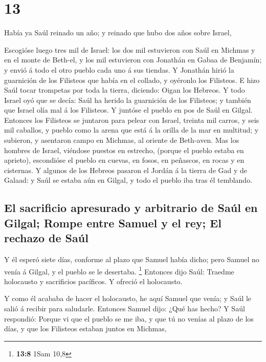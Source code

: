 \hypertarget{section-12}{%
\section{13}\label{section-12}}

 Había ya Saúl reinado un año; y reinado que hubo dos años
sobre Israel,

 Escogióse luego tres mil de Israel: los dos mil estuvieron
con Saúl en Michmas y en el monte de Beth-el, y los mil estuvieron con
Jonathán en Gabaa de Benjamín; y envió á todo el otro pueblo cada uno á
sus tiendas.  Y Jonathán hirió la guarnición de los
Filisteos que había en el collado, y oyéronlo los Filisteos. E hizo Saúl
tocar trompetas por toda la tierra, diciendo: Oigan los Hebreos.
 Y todo Israel oyó que se decía: Saúl ha herido la
guarnición de los Filisteos; y también que Israel olía mal á los
Filisteos. Y juntóse el pueblo en pos de Saúl en Gilgal. 
Entonces los Filisteos se juntaron para pelear con Israel, treinta mil
carros, y seis mil caballos, y pueblo como la arena que está á la orilla
de la mar en multitud; y subieron, y asentaron campo en Michmas, al
oriente de Beth-aven.  Mas los hombres de Israel, viéndose
puestos en estrecho, (porque el pueblo estaba en aprieto), escondióse el
pueblo en cuevas, en fosos, en peñascos, en rocas y en cisternas.
 Y algunos de los Hebreos pasaron el Jordán á la tierra de
Gad y de Galaad: y Saúl se estaba aún en Gilgal, y todo el pueblo iba
tras él temblando.

\hypertarget{el-sacrificio-apresurado-y-arbitrario-de-sauxfal-en-gilgal-rompe-entre-samuel-y-el-rey-el-rechazo-de-sauxfal}{%
\subsection{El sacrificio apresurado y arbitrario de Saúl en Gilgal;
Rompe entre Samuel y el rey; El rechazo de
Saúl}\label{el-sacrificio-apresurado-y-arbitrario-de-sauxfal-en-gilgal-rompe-entre-samuel-y-el-rey-el-rechazo-de-sauxfal}}

 Y él esperó siete días, conforme al plazo que Samuel había
dicho; pero Samuel no venía á Gilgal, y el pueblo se le desertaba.
\footnote{\textbf{13:8} 1Sam 10,8}  Entonces dijo Saúl:
Traedme holocausto y sacrificios pacíficos. Y ofreció el holocausto.

 Y como él acababa de hacer el holocausto, he aquí Samuel
que venía; y Saúl le salió á recibir para saludarle. 
Entonces Samuel dijo: ¿Qué has hecho? Y Saúl respondió: Porque vi que el
pueblo se me iba, y que tú no venías al plazo de los días, y que los
Filisteos estaban juntos en Michmas,

